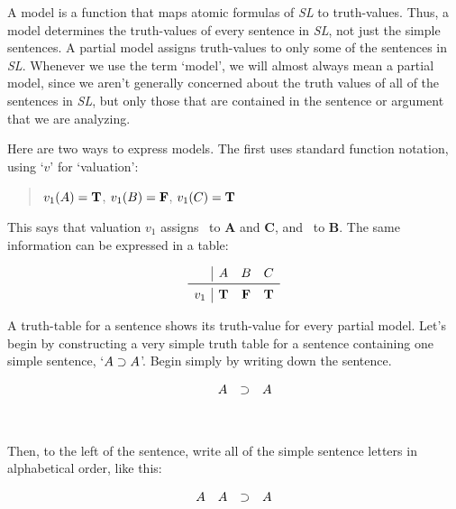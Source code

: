 \documentclass[../logic-text.tex]{subfiles}
\begin{document}
A model is a function that maps atomic formulas of \emph{SL} to truth-values.
Thus, a model determines the truth-values of every sentence in \emph{SL}, not just the simple sentences.
A partial model assigns truth-values to only some of the sentences in \emph{SL}.
Whenever we use the term \enquote*{model}, we will almost always mean a partial model, since we aren't generally concerned about the truth values of all of the sentences in \emph{SL}, but only those that are contained in the sentence or argument that we are analyzing.

Here are two ways to express models. The first uses standard function notation, using \enquote*{\(v\)} for \enquote*{valuation}:

\begin{quote}
  \(v_{1}(A) = \textbf{T}\), \(v_{1}(B) = \textbf{F}\), \(v_{1}(C) = \textbf{T}\)
\end{quote}

\noindent This says that valuation \(v_{1}\) assigns \true\ to \textbf{A} and \textbf{C}, and \false\ to \textbf{B}. The same information can be expressed in a table:


\[
\begin{array}{c|ccc}
  & A & B & C \\ \midrule
  v_{1}& \true & \false & \true \\
\end{array}
\]


A truth-table for a sentence shows its truth-value for every partial model.
Let's begin by constructing a very simple truth table for a sentence containing one simple sentence, \enquote*{\(A \supset A\)}.
Begin simply by writing down the sentence.

\[
  \begin{array}{cccc}
    \phantom{A} & A & \supset & A \\
    \phantom{A}&&&\\
    \phantom{A}&&&\\
  \end{array}
\]

Then, to the left of the sentence, write all of the simple sentence letters in alphabetical order, like this:

\[
  \begin{array}{cccc}
    A & A & \supset & A \\
    \phantom{A}&&&\\
    \phantom{A}&&&\\
  \end{array}
\]
\end{document}
